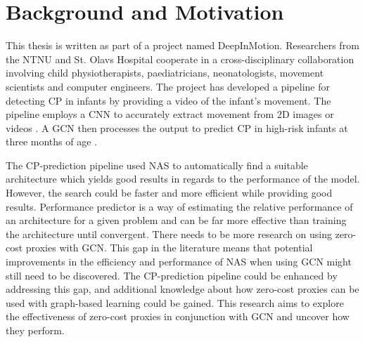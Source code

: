  \section{Background and Motivation}
This thesis is written as part of a project named DeepInMotion. Researchers from the \Gls{NTNU} and St. Olavs Hospital cooperate in a cross-disciplinary collaboration involving child physiotherapists, paediatricians, neonatologists, movement scientists and computer engineers. The project has developed a pipeline for detecting \Gls{CP} in infants by providing a video of the infant's movement. The pipeline employs a \Gls{CNN} to accurately extract movement from 2D images or videos \autocite{groos2021efficientpose}. A \gls{GCN} then processes the output to predict \gls{CP} in high-risk infants at three months of age \autocite{groos2022convolutional}. 

The \gls{CP}-prediction pipeline used \gls{NAS} to automatically find a suitable architecture which yields good results in regards to the performance of the model. However, the search could be faster and more efficient while providing good results. Performance predictor is a way of estimating the relative performance of an architecture for a given problem and can be far more effective than training the architecture until convergent. There needs to be more research on using zero-cost proxies with \gls{GCN}. This gap in the literature means that potential improvements in the efficiency and performance of \gls{NAS} when using \gls{GCN} might still need to be discovered. The \gls{CP}-prediction pipeline could be enhanced by addressing this gap, and additional knowledge about how zero-cost proxies can be used with graph-based learning could be gained. This research aims to explore the effectiveness of zero-cost proxies in conjunction with \gls{GCN} and uncover how they perform. 